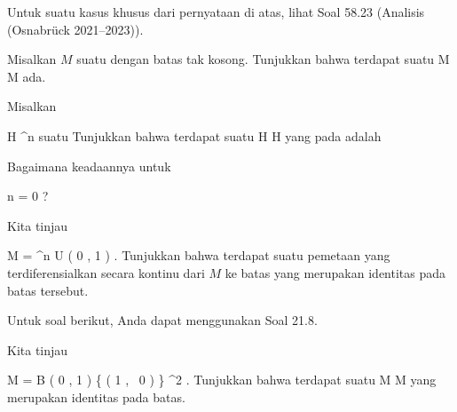 Untuk suatu kasus khusus dari pernyataan di atas, lihat
Soal 58.23 (Analisis (Osnabrück 2021--2023)).

{}
{

Misalkan $M$ suatu
dengan batas tak kosong. Tunjukkan bahwa terdapat suatu
\maabb {} { M } { \partial M
} {}
ada.

}
{} {}

{}
{

Misalkan

\mavergleichskette
{\vergleichskette
{ H
}
{ \subseteq }{ \R^n
}
{  }{
}
{    }{
}
{   }{
}
}
{}{}{}
 {} {}
suatu
Tunjukkan bahwa terdapat suatu
\maabbdisp {\varphi} { H } { \partial H
} {}
yang
pada
 adalah

}
{Bagaimana keadaannya untuk

\mavergleichskette
{\vergleichskette
{ n
}
{ = }{ 0
}
{  }{
}
{    }{
}
{   }{
}
}
{}{}{}?} {}

{}
{

Kita tinjau

\mavergleichskette
{\vergleichskette
{ M
}
{ = }{ \R^n \setminus  U \left(   0 , 1  \right)
}
{  }{
}
{    }{
}
{   }{
}
}
{}{}{.}
Tunjukkan bahwa terdapat suatu pemetaan yang terdiferensialkan secara kontinu dari $M$ ke batas
yang merupakan identitas pada batas tersebut.

}
{} {}

Untuk soal berikut, Anda dapat menggunakan
Soal 21.8.

{}
{

Kita tinjau

\mavergleichskettedisp
{\vergleichskette
{ M
}
{ =} { B  \left(  0 , 1 \right) \setminus \{  \left(  1   , \,   0                   \right) \}
}
{ \subseteq} { \R^2
}
{ } {
}
{ } {
}
}
{}{}{.}
Tunjukkan bahwa terdapat suatu
\maabbdisp {\varphi} { M } { \partial M
} {}
yang merupakan identitas pada batas.

}
{} {}

